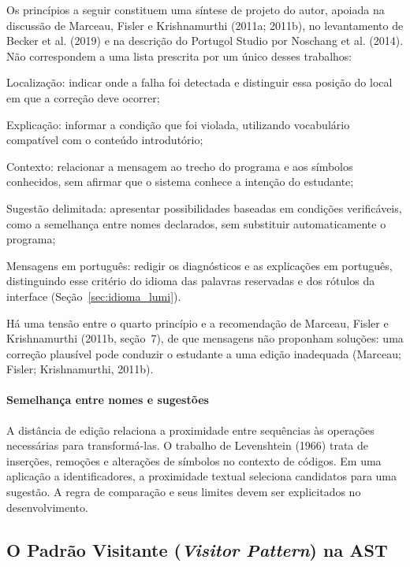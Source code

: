 \documentclass[
    12pt
    ,oneside
    ,a4paper
    ,chapter=TITLE
    ,section=TITLE
    ,sumario=abnt-6027-2012]{abntex2}
\newcommand{\citeMarceauOnward}{(Marceau; Fisler; Krishnamurthi, 2011b)}
\begin{document}
Os princípios a seguir constituem uma síntese de projeto do autor, apoiada na
discussão de Marceau, Fisler e Krishnamurthi (2011a; 2011b), no levantamento de
Becker et al. (2019) e na descrição do Portugol Studio por Noschang et al. (2014).
Não correspondem a uma lista prescrita por um único desses trabalhos:

\begin{alineas}
    \item Localização: indicar onde a falha foi detectada e distinguir essa posição do local em que a correção deve ocorrer;
    \item Explicação: informar a condição que foi violada, utilizando vocabulário compatível com o conteúdo introdutório;
    \item Contexto: relacionar a mensagem ao trecho do programa e aos símbolos conhecidos, sem afirmar que o sistema conhece a intenção do estudante;
    \item Sugestão delimitada: apresentar possibilidades baseadas em condições verificáveis, como a semelhança entre nomes declarados, sem substituir automaticamente o programa;
    \item Mensagens em português: redigir os diagnósticos e as explicações em português, distinguindo esse critério do idioma das palavras reservadas e dos rótulos da interface (Seção~\ref{sec:idioma_lumi}).
\end{alineas}

Há uma tensão entre o quarto princípio e a recomendação de Marceau, Fisler e
Krishnamurthi (2011b, seção~7), de que mensagens não proponham soluções: uma
correção plausível pode conduzir o estudante a uma edição inadequada \citeMarceauOnward.

\paragraph*{Semelhança entre nomes e sugestões}
A distância de edição relaciona a proximidade entre sequências às operações
necessárias para transformá-las. O trabalho de Levenshtein (1966) trata de
inserções, remoções e alterações de símbolos no contexto de códigos. Em uma aplicação a identificadores, a proximidade textual seleciona candidatos para uma sugestão. A regra de comparação e seus limites devem ser
explicitados no desenvolvimento.

\subsection{O Padrão Visitante (\textit{Visitor Pattern}) na AST}
\end{document}
